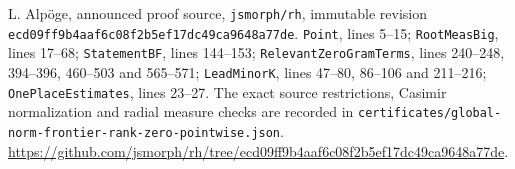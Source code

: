 L. Alp\"oge, announced proof source, \texttt{jsmorph/rh},
immutable revision
\texttt{ecd09ff9b4aaf6c08f2b5ef17dc49ca9648a77de}.
\texttt{Point}, lines 5--15;
\texttt{RootMeasBig}, lines 17--68;
\texttt{StatementBF}, lines 144--153;
\texttt{RelevantZeroGramTerms}, lines 240--248, 394--396,
460--503 and 565--571;
\texttt{LeadMinorK}, lines 47--80, 86--106 and 211--216;
\texttt{OnePlaceEstimates}, lines 23--27.
The exact source restrictions, Casimir normalization and radial
measure checks are recorded in
\texttt{certificates/global-norm-frontier-rank-zero-pointwise.json}.
\url{https://github.com/jsmorph/rh/tree/ecd09ff9b4aaf6c08f2b5ef17dc49ca9648a77de}.

